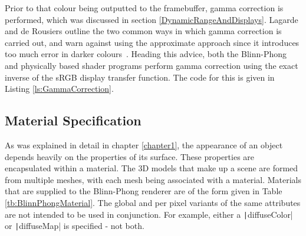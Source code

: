 Prior to that colour being outputted to the framebuffer, gamma correction is performed, which was discussed in section \ref{DynamicRangeAndDisplays}. Lagarde and de Rousiers outline the two common ways in which gamma correction is carried out, and warn against using the approximate approach since it introduces too much error in darker colours~\cite{MovingFrostbitetoPBR}. Heading this advice, both the Blinn-Phong and physically based shader programs perform gamma correction using the exact inverse of the sRGB display transfer function. The code for this is given in Listing \ref{ls:GammaCorrection}.


\subsection{Material Specification} \label{BlinnPhongRendererMaterialSpecification}

As was explained in detail in chapter \ref{chapter1}, the appearance of an object depends heavily on the properties of its surface. These properties are encapsulated within a material. The 3D models that make up a scene are formed from multiple meshes, with each mesh being associated with a material. Materials that are supplied to the Blinn-Phong renderer are of the form given in Table \ref{tb:BlinnPhongMaterial}. The global and per pixel variants of the same attributes are not intended to be used in conjunction. For example, either a \texttt|diffuseColor| or \texttt|diffuseMap| is specified - not both.

\vspace{20pt}

